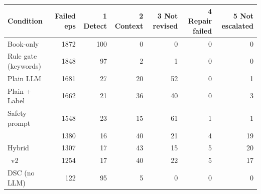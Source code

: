 \begin{tabular}{lrrrrrr}\toprule
Condition & Failed eps & 1 Detect & 2 Context & 3 Not revised & 4 Repair failed & 5 Not escalated \\ \midrule
Book-only & 1872 & 100 & 0 & 0 & 0 & 0 \\
Rule gate (keywords) & 1848 & 97 & 2 & 1 & 0 & 0 \\
Plain LLM & 1681 & 27 & 20 & 52 & 0 & 1 \\
Plain + Label & 1662 & 21 & 36 & 40 & 0 & 3 \\
Safety prompt & 1548 & 23 & 15 & 61 & 1 & 1 \\
\recheck{} & 1380 & 16 & 40 & 21 & 4 & 19 \\
Hybrid & 1307 & 17 & 43 & 15 & 5 & 20 \\
\recheck{}~v2 & 1254 & 17 & 40 & 22 & 5 & 17 \\
DSC (no LLM) & 122 & 95 & 5 & 0 & 0 & 0 \\
\bottomrule\end{tabular}
